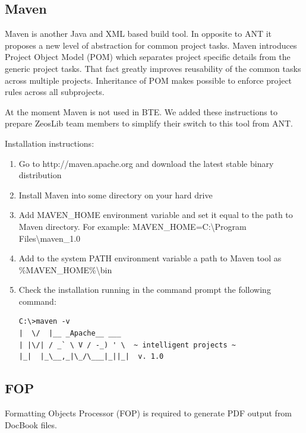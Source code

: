 \documentclass[a4paper,12pt,oneside]{book}
\begin{document}
\subsection{Maven}
Maven is another Java and XML based build tool.
In opposite to ANT it proposes a new level of abstraction for common project tasks.
Maven introduces Project Object Model (POM) which separates project specific details from the generic project tasks.
That fact greatly improves reusability of the common tasks across multiple projects.
Inheritance of POM makes possible to enforce project rules across all subprojects.

At the moment Maven is not used in BTE.
We added these instructions to prepare ZeosLib team members to simplify their switch to this tool from ANT.

Installation instructions:
\begin{enumerate}
  \item Go to http://maven.apache.org and download the latest stable binary distribution
	\item Install Maven into some directory on your hard drive
	\item
	  Add MAVEN\_HOME environment variable and set it equal to the path to Maven directory.
		For example: MAVEN\_HOME=C:\textbackslash Program Files\textbackslash maven\_1.0
	\item Add to the system PATH environment variable a path to Maven tool as \%MAVEN\_HOME\%\textbackslash bin
	\item Check the installation running in the command prompt the following command:
	  \begin{verbatim}
C:\>maven -v
|  \/  |__ _Apache__ ___
| |\/| / _` \ V / -_) ' \  ~ intelligent projects ~
|_|  |_\__,_|\_/\___|_||_|  v. 1.0
    \end{verbatim}
\end{enumerate}

\subsection{FOP}

Formatting Objects Processor (FOP) is required to generate PDF output from DocBook files.
\end{document}
